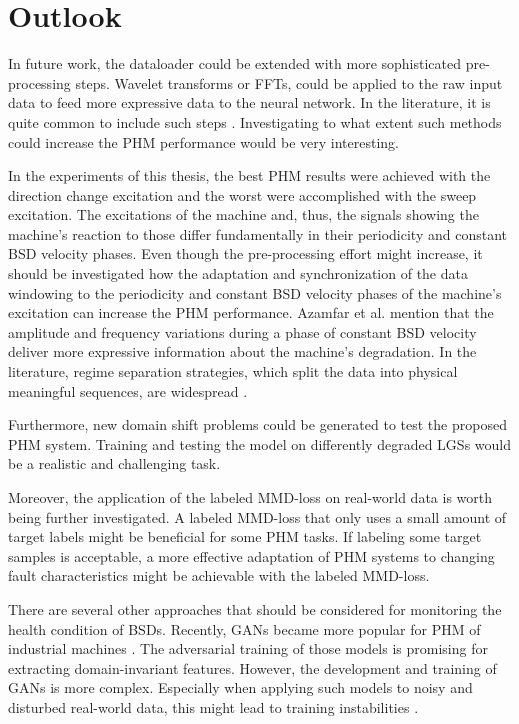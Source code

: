 \chapter{Outlook}
In future work, the dataloader could be extended with more sophisticated pre-processing steps. Wavelet transforms or FFTs, could be applied to the raw input data to feed more expressive data to the neural network. In the literature, it is quite common to include such steps \cite{LiPin2018} \cite{Li2018} \cite{Kang2020} \cite{Zhang2017}. Investigating to what extent such methods could increase the PHM performance would be very interesting.

In the experiments of this thesis, the best PHM results were achieved with the direction change excitation and the worst were accomplished with the sweep excitation. The excitations of the machine and, thus, the signals showing the machine’s reaction to those differ fundamentally in their periodicity and constant BSD velocity phases. Even though the pre-processing effort might increase, it should be investigated how the adaptation and synchronization of the data windowing to the periodicity and constant BSD velocity phases of the machine's excitation can increase the PHM performance. Azamfar et al. \cite{AZAMFAR2020103932} mention that the amplitude and frequency variations during a phase of constant BSD velocity deliver more expressive information about the machine's degradation. In the literature, regime separation strategies, which split the data into physical meaningful sequences, are widespread \cite{AZAMFAR2020103932} \cite{Pandhare2021}.

Furthermore, new domain shift problems could be generated to test the proposed PHM system. Training and testing the model on differently degraded LGSs would be a realistic and challenging task.

Moreover, the application of the labeled MMD-loss on real-world data is worth being further investigated. A labeled MMD-loss that only uses a small amount of target labels might be beneficial for some PHM tasks. If labeling some target samples is acceptable, a more effective adaptation of PHM systems to changing fault characteristics might be achievable with the labeled MMD-loss.

There are several other approaches that should be considered for monitoring the health condition of BSDs. Recently, GANs became more popular for PHM of industrial machines \cite{Zhang2019}. The adversarial training of those models is promising for extracting domain-invariant features. However, the development and training of GANs is more complex. Especially when applying such models to noisy and disturbed real-world data, this might lead to training instabilities \cite{Zhang2019}. 



